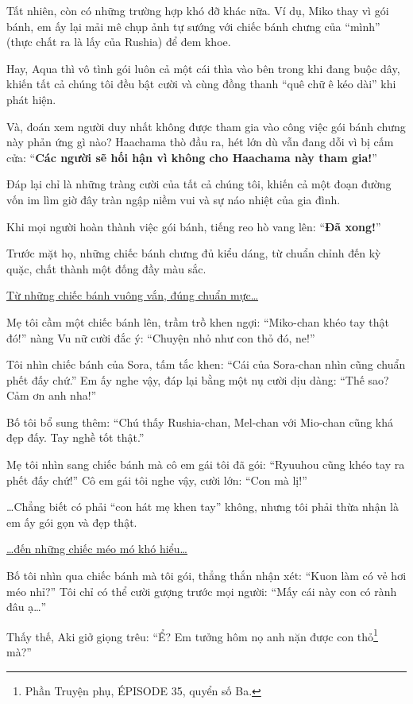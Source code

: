 \documentclass[../main.tex]{subfiles}
\begin{document}
Tất nhiên, còn có những trường hợp khó đỡ khác nữa. Ví dụ, Miko thay vì gói bánh, em ấy lại mải mê chụp ảnh tự sướng với chiếc bánh chưng của ``mình'' (thực chất ra là lấy của Rushia) để đem khoe.

Hay, Aqua thì vô tình gói luôn cả một cái thìa vào bên trong khi đang buộc dây, khiến tất cả chúng tôi đều bật cười và cùng đồng thanh ``quê chữ ê kéo dài'' khi phát hiện.

Và, đoán xem người duy nhất không được tham gia vào công việc gói bánh chưng này phản ứng gì nào? Haachama thò đầu ra, hét lớn dù vẫn đang dỗi vì bị cấm cửa: ``\textbf{Các người sẽ hối hận vì không cho Haachama này tham gia!}''

Đáp lại chỉ là những tràng cười của tất cả chúng tôi, khiến cả một đoạn đường vốn im lìm giờ đây tràn ngập niềm vui và sự náo nhiệt của gia đình.

\ct

Khi mọi người hoàn thành việc gói bánh, tiếng reo hò vang lên: ``\textbf{Đã xong!}''

Trước mặt họ, những chiếc bánh chưng đủ kiểu dáng, từ chuẩn chỉnh đến kỳ quặc, chất thành một đống đầy màu sắc.

\uline{Từ những chiếc bánh vuông vắn, đúng chuẩn mực\dots}

Mẹ tôi cầm một chiếc bánh lên, trầm trồ khen ngợi: ``Miko-chan khéo tay thật đó!'' nàng Vu nữ cười đắc ý: ``Chuyện nhỏ như con thỏ đó, ne!''

Tôi nhìn chiếc bánh của Sora, tấm tắc khen: ``Cái của Sora-chan nhìn cũng chuẩn phết đấy chứ.'' Em ấy nghe vậy, đáp lại bằng một nụ cười dịu dàng: ``Thế sao? Cảm ơn anh nha!''

Bố tôi bổ sung thêm: ``Chú thấy Rushia-chan, Mel-chan với Mio-chan cũng khá đẹp đấy. Tay nghề tốt thật.''

Mẹ tôi nhìn sang chiếc bánh mà cô em gái tôi đã gói: ``Ryuuhou cũng khéo tay ra phết đấy chứ!'' Cô em gái tôi nghe vậy, cười lớn: ``Con mà lị!''

\dots Chẳng biết có phải ``con hát mẹ khen tay'' không, nhưng tôi phải thừa nhận là em ấy gói gọn và đẹp thật.

\uline{\dots đến những chiếc méo mó khó hiểu\dots}

Bố tôi nhìn qua chiếc bánh mà tôi gói, thẳng thắn nhận xét: ``Kuon làm có vẻ hơi méo nhỉ?'' Tôi chỉ có thể cười gượng trước mọi người: ``Mấy cái này con có rành đâu ạ\dots''

Thấy thế, Aki giở giọng trêu: ``Ể? Em tưởng hôm nọ anh nặn được con thỏ\footnote{Phần {\abv Truyện phụ}, {\flaregothic ÉPISODE 35}, quyển số Ba.} mà?''
\end{document}
